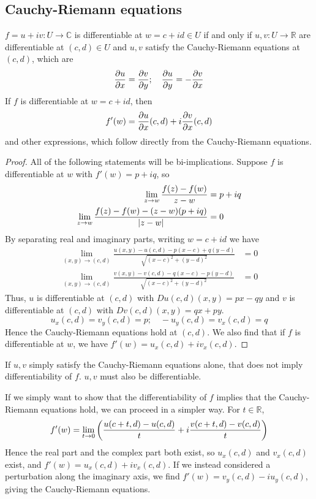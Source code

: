 \subsection{Cauchy-Riemann equations}
\begin{theorem}
	\( f = u + iv \colon U \to \mathbb C \) is differentiable at \( w = c + id \in U \) if and only if \( u,v \colon U \to \mathbb R \) are differentiable at \( (c,d) \in U \) and \( u,v \) satisfy the Cauchy-Riemann equations at \( (c,d) \), which are
	\[
		\pdv{u}{x} = \pdv{v}{y};\quad \pdv{u}{y} = -\pdv{v}{x}
	\]
	If \( f \) is differentiable at \( w = c + id \), then
	\[
		f'(w) = \pdv{u}{x}\qty(c,d) + i \pdv{v}{x}\qty(c,d)
	\]
	and other expressions, which follow directly from the Cauchy-Riemann equations.
\end{theorem}
\begin{proof}
	All of the following statements will be bi-implications.
	Suppose \( f \) is differentiable at \( w \) with \( f'(w) = p+iq \), so
	\begin{align*}
		\lim_{z \to w} \frac{f(z) - f(w)}{z-w}                     & = p+iq \\
		\lim_{z \to w} \frac{f(z) - f(w) - (z-w)(p+iq)}{\abs{z-w}} & = 0
	\end{align*}
	By separating real and imaginary parts, writing \( w = c + id \) we have
	\begin{align*}
		\lim_{(x,y) \to (c,d)} \frac{u(x,y) - u(c,d) - p(x-c) + q(y-d)}{\sqrt{(x-c)^2 + (y-d)^2}} & = 0 \\
		\lim_{(x,y) \to (c,d)} \frac{v(x,y) - v(c,d) - q(x-c) - p(y-d)}{\sqrt{(x-c)^2 + (y-d)^2}} & = 0
	\end{align*}
	Thus, \( u \) is differentiable at \( (c,d) \) with \( Du(c,d)(x,y) = px - qy \) and \( v \) is differentiable at \( (c,d) \) with \( Dv(c,d)(x,y) = qx + py \).
	\[
		u_x(c,d) = v_y(c,d) = p;\quad -u_y(c,d) = v_x(c,d) = q
	\]
	Hence the Cauchy-Riemann equations hold at \( (c,d) \).
	We also find that if \( f \) is differentiable at \( w \), we have \( f'(w) = u_x(c,d) + i v_x(c,d) \).
\end{proof}
\begin{remark}
	If \( u,v \) simply satisfy the Cauchy-Riemann equations alone, that does not imply differentiability of \( f \).
	\( u,v \) must also be differentiable.
\end{remark}
\begin{remark}
	If we simply want to show that the differentiability of \( f \) implies that the Cauchy-Riemann equations hold, we can proceed in a simpler way.
	For \( t \in \mathbb R \),
	\[
		f'(w) = \lim_{t \to 0} \qty(\frac{u(c+t,d) - u(c,d)}{t} + i \frac{v(c+t,d) - v(c,d)}{t})
	\]
	Hence the real part and the complex part both exist, so \( u_x(c,d) \) and \( v_x(c,d) \) exist, and \( f'(w) = u_x(c,d) + i v_x(c,d) \).
	If we instead considered a perturbation along the imaginary axis, we find \( f'(w) = v_y(c,d) - iu_y(c,d) \), giving the Cauchy-Riemann equations.
\end{remark}
